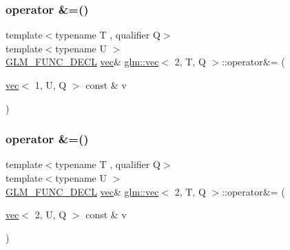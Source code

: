 \mbox{\label{structglm_1_1vec_3_012_00_01_t_00_01_q_01_4_a0f1cfa1940438903f605b620a928ce38}} 
\subsubsection{\texorpdfstring{operator \&=()}{operator \&=()}\hspace{0.1cm}{\footnotesize\ttfamily [2/3]}}
{\footnotesize\ttfamily template$<$typename T , qualifier Q$>$ \\
template$<$typename U $>$ \\
\hyperlink{setup_8hpp_ab2d052de21a70539923e9bcbf6e83a51}{G\+L\+M\+\_\+\+F\+U\+N\+C\+\_\+\+D\+E\+CL} \hyperlink{structglm_1_1vec}{vec}\& \hyperlink{structglm_1_1vec}{glm\+::vec}$<$ 2, T, Q $>$\+::operator\&= (\begin{DoxyParamCaption}\item[{\hyperlink{structglm_1_1vec}{vec}$<$ 1, U, Q $>$ const \&}]{v }\end{DoxyParamCaption})}

\mbox{\label{structglm_1_1vec_3_012_00_01_t_00_01_q_01_4_a09a49ab5d55622ad568b054276c84786}} 
\subsubsection{\texorpdfstring{operator \&=()}{operator \&=()}\hspace{0.1cm}{\footnotesize\ttfamily [3/3]}}
{\footnotesize\ttfamily template$<$typename T , qualifier Q$>$ \\
template$<$typename U $>$ \\
\hyperlink{setup_8hpp_ab2d052de21a70539923e9bcbf6e83a51}{G\+L\+M\+\_\+\+F\+U\+N\+C\+\_\+\+D\+E\+CL} \hyperlink{structglm_1_1vec}{vec}\& \hyperlink{structglm_1_1vec}{glm\+::vec}$<$ 2, T, Q $>$\+::operator\&= (\begin{DoxyParamCaption}\item[{\hyperlink{structglm_1_1vec}{vec}$<$ 2, U, Q $>$ const \&}]{v }\end{DoxyParamCaption})}

